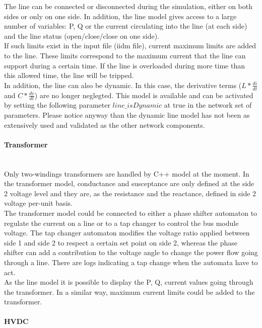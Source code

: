 \documentclass[a4paper, 12pt]{report}
\begin{document}
The line can be connected or disconnected during the simulation, either on both sides or only on one side. In addition, the line model gives access to a large number of variables: P, Q or the current circulating into the line (at each side) and the line status (open/close/close on one side). \\
If such limits exist in the input file (iidm file), current maximum limits are added to the line. These limits correspond to the maximum current that the line can support during a certain time. If the line is overloaded during more time than this allowed time, the line will be tripped. \\

In addition, the line can also be dynamic. In this case, the derivative terms ($L * \frac{di}{dt}$ and $C * \frac{dv}{dt}$) are no longer neglegted. This model is available and can be activated by setting the following parameter $line\_isDynamic$ at true in the network set of parameters. Please notice anyway than the dynamic line model has not been as extensively used and validated as the other network components.

\paragraph{Transformer}
~~\\

Only two-windings transformers are handled by \Dynawo C++ model at the moment. In the transformer model, conductance and susceptance are only defined at the side 2 voltage level and they are, as the resistance and the reactance, defined in side 2 voltage per-unit basis. \\
The transformer model could be connected to either a phase shifter automaton to regulate the current on a line or to a tap changer to control the bus module voltage. The tap changer automaton modifies the voltage ratio applied between side 1 and side 2 to respect a certain set point on side 2, whereas the phase shifter can add a contribution to the voltage angle to change the power flow going through a line. There are logs indicating a tap change when the automata have to act. \\
As the line model it is possible to display the P, Q, current values going through the transformer. In a similar way, maximum current limits could be added to the transformer. \\

\paragraph{HVDC}
~~\\
\end{document}
